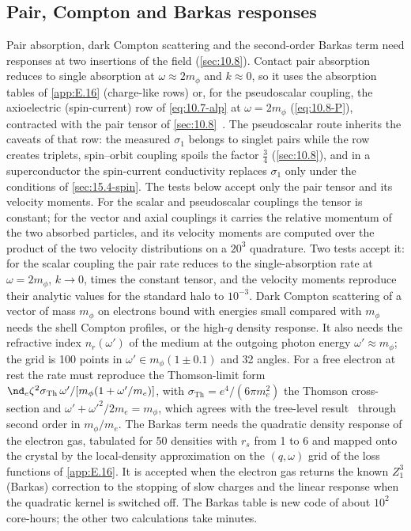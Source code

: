 \subsection{Pair, Compton and Barkas responses}

Pair absorption, dark Compton scattering and the second-order Barkas term need responses at two insertions of the field (\cref{sec:10.8}). Contact pair absorption reduces to single absorption at $\omega \approx 2m_\phi$ and $k \approx 0$, so it uses the absorption tables of \cref{app:E.16} (charge-like rows) or, for the pseudoscalar coupling, the axioelectric (spin-current) row of \cref{eq:10.7-alp} at $\omega = 2m_\phi$ (\cref{eq:10.8-P}), contracted with the pair tensor of \cref{sec:10.8}~\cite[Eqs.~(5)--(8)]{bauer2026dark}. The pseudoscalar route inherits the caveats of that row: the measured $\sigma_1$ belongs to singlet pairs while the row creates triplets, spin--orbit coupling spoils the factor $\frac34$ (\cref{sec:10.8}), and in a superconductor the spin-current conductivity replaces $\sigma_1$ only under the conditions of \cref{sec:15.4-spin}. The tests below accept only the pair tensor and its velocity moments. For the scalar and pseudoscalar couplings the tensor is constant; for the vector and axial couplings it carries the relative momentum of the two absorbed particles, and its velocity moments are computed over the product of the two velocity distributions on a $20^3$ quadrature. Two tests accept it: for the scalar coupling the pair rate reduces to the single-absorption rate at $\omega = 2m_\phi$, $k \to 0$, times the constant tensor, and the velocity moments reproduce their analytic values for the standard halo to $10^{-3}$. Dark Compton scattering of a vector of mass $m_\phi$ on electrons bound with energies small compared with $m_\phi$ needs the shell Compton profiles, or the high-$q$ density response. It also needs the refractive index $n_r(\omega')$ of the medium at the outgoing photon energy $\omega' \approx m_\phi$; the grid is 100 points in $\omega' \in m_\phi(1 \pm 0.1)$ and 32 angles. For a free electron at rest the rate must reproduce the Thomson-limit form $\nd_e\zeta^2\sigma_{\mathrm{Th}}\,\omega'/[m_\phi(1 + \omega'/m_e)]$, with $\sigma_{\mathrm{Th}} = e^4/(6\pi m_e^2)$ the Thomson cross-section and $\omega' + \omega'^2/2m_e = m_\phi$, which agrees with the tree-level result~\cite[Eq.~(2)]{hochberg2022impact} through second order in $m_\phi/m_e$. The Barkas term needs the quadratic density response of the electron gas, tabulated for 50 densities with $r_s$ from 1 to 6 and mapped onto the crystal by the local-density approximation on the $(q,\omega)$ grid of the loss functions of \cref{app:E.16}. It is accepted when the electron gas returns the known $Z_1^3$ (Barkas) correction to the stopping of slow charges and the linear response when the quadratic kernel is switched off. The Barkas table is new code of about $10^2$ core-hours; the other two calculations take minutes.
